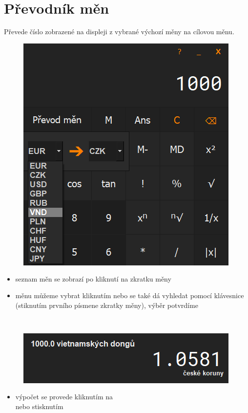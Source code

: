 \documentclass[a4paper, 12pt]{article}
\begin{document}
\section{Převodník měn}
Převede číslo zobrazené na displeji z vybrané výchozí měny na cílovou měnu.
\\%
\begin{minipage}{0.43\textwidth}
\begin{figure}[H]
\includegraphics[scale=0.5]{prevodmenrozklik.png}
\end{figure}
\end{minipage}
\begin{minipage}[c]{0.62\textwidth}
\begin{itemize}
\item seznam měn se zobrazí po kliknutí na zkratku měny
\item měnu můžeme vybrat kliknutím nebo se také dá vyhledat pomocí klávesnice (stiknutím prvního písmene zkratky měny), výběr potvrdíme \keys{\return} 

\end{itemize}
\end{minipage}
\\%
\begin{minipage}{0.43\textwidth}
\begin{figure}[H]
\includegraphics[scale=0.5]{prevedenamena.png}
\end{figure}
\end{minipage}
\begin{minipage}[c]{0.62\textwidth}
\begin{itemize}
\item výpočet se provede kliknutím na \keys{=}\\ nebo stisknutím \keys{\return}
\end{itemize}
\end{minipage}
\end{document}
